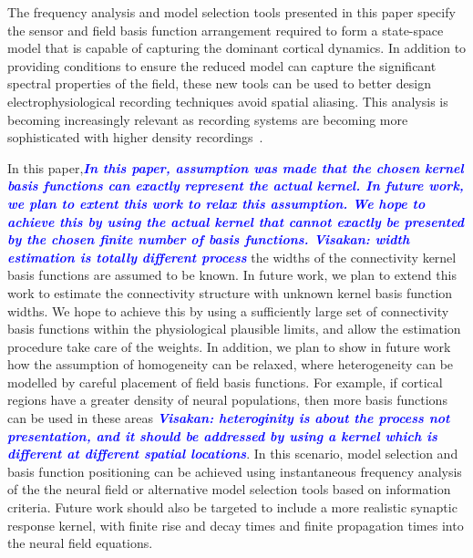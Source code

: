 \documentclass[10pt,a4paper]{article}
\newcommand{\parham}[1]{\textsf{\emph{\textbf{\textcolor{blue}{#1}}}}}
\begin{document}
The frequency analysis and model selection tools presented in this paper specify the sensor and field basis function arrangement required to form a state-space model that is capable of capturing the dominant cortical dynamics. In addition to providing conditions to ensure the reduced model can capture the significant spectral properties of the field, these new tools can be used to better design electrophysiological recording techniques avoid spatial aliasing. This analysis is becoming increasingly relevant as recording systems are becoming more sophisticated with higher density recordings~\cite{Brinkmann2009}. 

In this paper,\parham{In this paper, assumption was made that the chosen kernel basis functions can exactly represent the actual kernel. In future work, we plan to extent this work to relax this assumption. We hope to achieve this by using the actual kernel that cannot exactly be presented by the chosen finite number of basis functions. Visakan: width estimation is totally different process} the widths of the connectivity kernel basis functions are assumed to be known. In future work, we plan to extend this work to estimate the connectivity structure with unknown kernel basis function widths. We hope to achieve this by using a sufficiently large set of connectivity basis functions within the physiological plausible limits, and allow the estimation procedure take care of the weights. In addition, we plan to show in future work how the assumption of homogeneity can be relaxed, where heterogeneity can be modelled by careful placement of field basis functions. For example, if cortical regions have a greater density of neural populations, then more basis functions can be used in these areas \parham{Visakan: heteroginity is about the process not presentation, and it should be addressed by using a kernel which is different at different spatial locations}. In this scenario, model selection and basis function positioning can be achieved using instantaneous frequency analysis of the the neural field or alternative model selection tools based on information criteria. Future work should also be targeted to include a more realistic synaptic response kernel, with finite rise and decay times and finite propagation times into the neural field equations.

\appendix 
\end{document}
